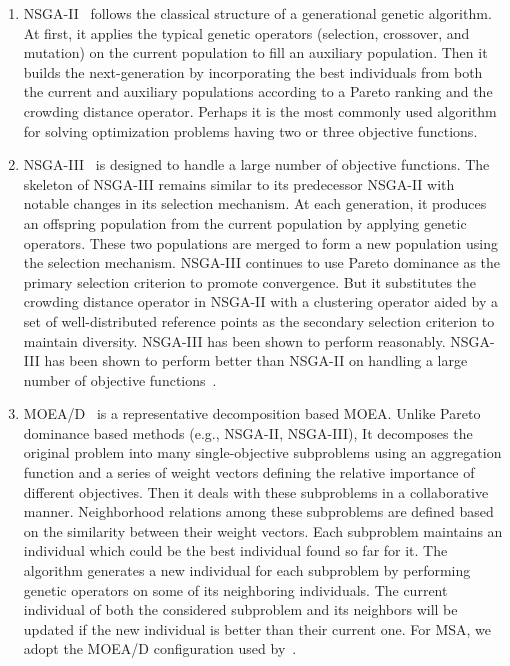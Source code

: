 \begin{enumerate}[label=(\alph*)]
	
	\item NSGA-II~\citep{deb2002fast} follows the classical structure of a generational genetic algorithm. At first, it applies the typical genetic operators (selection, crossover, and mutation) on the current population to fill an auxiliary population. Then it builds the next-generation by incorporating the best individuals from both the current and auxiliary populations according to a Pareto ranking and the crowding distance operator. Perhaps it is the most commonly used algorithm for solving optimization problems having two or three objective functions. 
	
	\item NSGA-III~\citep{deb2014evolutionary} is designed to handle a large number of objective functions. The skeleton of NSGA-III remains similar to its predecessor NSGA-II with notable changes in its selection mechanism. At each generation, it produces an offspring population from the current population by applying genetic operators. These two populations are merged to form a new population using the selection mechanism. NSGA-III continues to use Pareto dominance as the primary selection criterion to promote convergence. But it substitutes the crowding distance operator in NSGA-II with a clustering operator aided by a set of well-distributed reference points as the secondary selection criterion to maintain diversity. NSGA-III has been shown to perform reasonably. NSGA-III has been shown to perform better than NSGA-II on handling a large number of objective functions~\cite{deb2014evolutionary}.
	
	\item MOEA/D~\citep{zhang2007moea} is a representative decomposition based MOEA. Unlike Pareto dominance based methods (e.g., NSGA-II, NSGA-III), It decomposes the original problem into many single-objective subproblems using an aggregation function and a series of weight vectors defining the relative importance of different objectives. %
	Then it deals with these subproblems in a collaborative manner. Neighborhood relations among these subproblems are defined based on the similarity between their weight vectors. 
	Each subproblem maintains an individual which could be the best individual found so far for it. The algorithm generates a new individual for each subproblem by performing genetic operators on some of its neighboring individuals. The current individual of both the considered subproblem and its neighbors will be updated if the new individual is better than their current one. %
	For MSA, we adopt the MOEA/D configuration used by~\citep{zhu2015novel}.  
\end{enumerate} 



